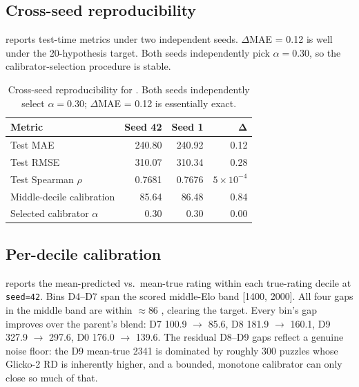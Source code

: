 \subsection{Cross-seed reproducibility}
\label{sec:repro}

 reports test-time metrics under two independent seeds. $\Delta$MAE = 0.12 \elo is well under the 20-\elo hypothesis target. Both seeds independently pick $\alpha = 0.30$, so the calibrator-selection procedure is stable.

\begin{table}[t]
\centering
\caption{Cross-seed reproducibility for \ours. Both seeds independently select $\alpha = 0.30$; $\Delta$MAE = 0.12 \elo is essentially exact.}
\label{tab:seeds}
\begin{tabular}{@{}lrrr@{}}
\toprule
\textbf{Metric} & \textbf{Seed 42} & \textbf{Seed 1} & $\bm{\Delta}$ \\
\midrule
Test MAE & 240.80 & 240.92 & 0.12 \\
Test RMSE & 310.07 & 310.34 & 0.28 \\
Test Spearman $\rho$ & 0.7681 & 0.7676 & $5\times10^{-4}$ \\
Middle-decile calibration & 85.64 & 86.48 & 0.84 \\
Selected calibrator $\alpha$ & 0.30 & 0.30 & 0.00 \\
\bottomrule
\end{tabular}
\end{table}

\subsection{Per-decile calibration}
\label{sec:decile}

 reports the mean-predicted vs.\ mean-true rating within each true-rating decile at \texttt{seed=42}. Bins D4--D7 span the scored middle-Elo band [1400, 2000]. All four gaps in the middle band are within $\approx 86$ \elo, clearing the target. Every bin's gap improves over the parent's blend: D7 100.9 $\to$ 85.6, D8 181.9 $\to$ 160.1, D9 327.9 $\to$ 297.6, D0 176.0 $\to$ 139.6. The residual D8--D9 gaps reflect a genuine noise floor: the D9 mean-true 2341 is dominated by roughly 300 puzzles whose Glicko-2 RD is inherently higher, and a bounded, monotone calibrator can only close so much of that.

